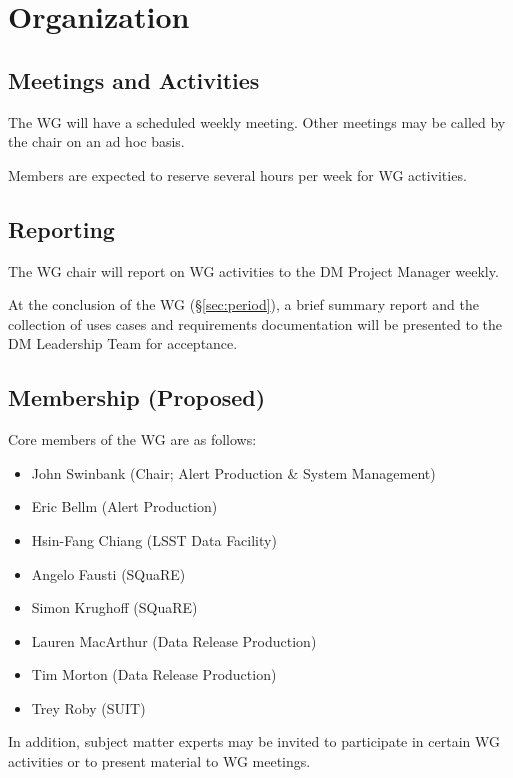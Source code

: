 \documentclass[DM,lsstdraft,toc]{lsstdoc}
\begin{document}
\section{Organization}

\subsection{Meetings and Activities}

The WG will have a scheduled weekly meeting. Other meetings may be called by
the chair on an ad hoc basis.

Members are expected to reserve several hours per week for WG activities.

\subsection{Reporting}

The WG chair will report on WG activities to the DM Project Manager weekly.

At the conclusion of the WG (\S\ref{sec:period}), a brief summary report and
the collection of uses cases and requirements documentation will be presented
to the DM Leadership Team for acceptance.

\subsection{Membership (Proposed)}
\label{sec:members}

Core members of the WG are as follows:

\begin{itemize}

  \item{John Swinbank (Chair; Alert Production \& System Management)}
  \item{Eric Bellm (Alert Production)}
  \item{Hsin-Fang Chiang (LSST Data Facility)}
  \item{Angelo Fausti (SQuaRE)}
  \item{Simon Krughoff (SQuaRE)}
  \item{Lauren MacArthur (Data Release Production)}
  \item{Tim Morton (Data Release Production)}
  \item{Trey Roby (SUIT)}

\end{itemize}

In addition, subject matter experts may be invited to participate in certain
WG activities or to present material to WG meetings.


\end{document}
